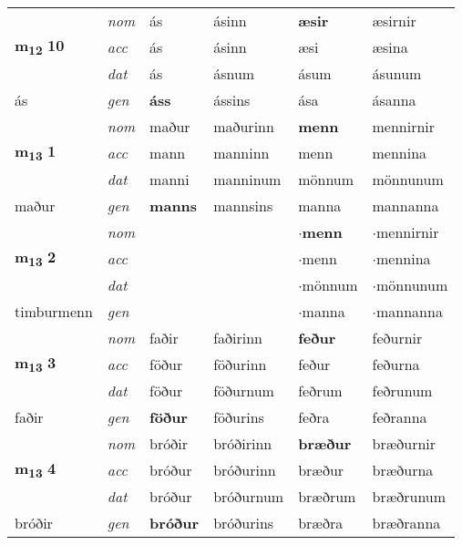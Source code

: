 \begin{longtable}[l]{llllll}
\multirow{3}{*}{{{\textbf{m{\textsubscript{12}}} \Large{\textbf{10}}}}}  & {\footnotesize{{\textit{nom}}}} & ás & ásinn    & \textbf{æsir} & æsirnir  \\*
 &  {\footnotesize{{\textit{acc}}}} & ás  & ásinn   & æsi  & æsina \\*
 &  {\footnotesize{{\textit{dat}}}} & ás & ásnum   & ásum & ásunum \\*
 {\footnotesize{ás}} &   {\footnotesize{{\textit{gen}}}} & \textbf{áss}  & ássins  & ása & ásanna \\
\cmidrule{1-6}


\multirow{3}{*}{{{\textbf{m{\textsubscript{13}}} \Large{\textbf{1}}}}}  & {\footnotesize{{\textit{nom}}}} & maður & maðurinn    & \textbf{menn} & mennirnir  \\*
 &  {\footnotesize{{\textit{acc}}}} & mann  & manninn   & menn  & mennina \\*
 &  {\footnotesize{{\textit{dat}}}} & manni & manninum   & mönnum & mönnunum \\*
 {\footnotesize{maður}} &   {\footnotesize{{\textit{gen}}}} & \textbf{manns}  & mannsins  & manna & mannanna \\
\cmidrule{1-6}


\multirow{3}{*}{{{\textbf{m{\textsubscript{13}}} \Large{\textbf{2}}}}}  & {\footnotesize{{\textit{nom}}}} &  &     & \textbf{$\cdot$menn} & $\cdot$mennirnir  \\*
 &  {\footnotesize{{\textit{acc}}}} &   &    & $\cdot$menn  & $\cdot$mennina \\*
 &  {\footnotesize{{\textit{dat}}}} &  &    & $\cdot$mönnum & $\cdot$mönnunum \\*
 {\footnotesize{timburmenn}} &   {\footnotesize{{\textit{gen}}}} & \textbf{}  &   & $\cdot$manna & $\cdot$mannanna \\
\cmidrule{1-6}


\multirow{3}{*}{{{\textbf{m{\textsubscript{13}}} \Large{\textbf{3}}}}}  & {\footnotesize{{\textit{nom}}}} & faðir & faðirinn    & \textbf{feður} & feðurnir  \\*
 &  {\footnotesize{{\textit{acc}}}} & föður  & föðurinn   & feður  & feðurna \\*
 &  {\footnotesize{{\textit{dat}}}} & föður & föðurnum   & feðrum & feðrunum \\*
 {\footnotesize{faðir}} &   {\footnotesize{{\textit{gen}}}} & \textbf{föður}  & föðurins  & feðra & feðranna \\
\cmidrule{1-6}


\multirow{3}{*}{{{\textbf{m{\textsubscript{13}}} \Large{\textbf{4}}}}}  & {\footnotesize{{\textit{nom}}}} & bróðir & bróðirinn    & \textbf{bræður} & bræðurnir  \\*
 &  {\footnotesize{{\textit{acc}}}} & bróður  & bróðurinn   & bræður  & bræðurna \\*
 &  {\footnotesize{{\textit{dat}}}} & bróður & bróðurnum   & bræðrum & bræðrunum \\*
 {\footnotesize{bróðir}} &   {\footnotesize{{\textit{gen}}}} & \textbf{bróður}  & bróðurins  & bræðra & bræðranna \\
\cmidrule{1-6}



\end{longtable}
